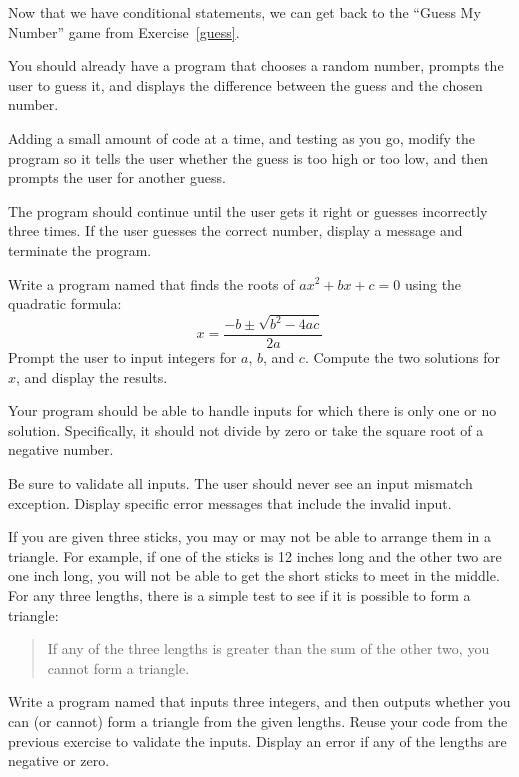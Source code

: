 \begin{exercise}  %

Now that we have conditional statements, we can get back to the ``Guess My Number'' game from Exercise~\ref{guess}.

You should already have a program that chooses a random number, prompts the user to guess it, and displays the difference between the guess and the chosen number.

Adding a small amount of code at a time, and testing as you go, modify the program so it tells the user whether the guess is too high or too low, and then prompts the user for another guess.

The program should continue until the user gets it right or guesses incorrectly three times.
If the user guesses the correct number, display a message and terminate the program.

\end{exercise}


\begin{exercise}  %

Write a program named  that finds the roots of $ax^2 + bx + c = 0$ using the quadratic formula:
$$ x = \frac{-b \pm \sqrt{b^2 - 4ac}}{2a} $$
Prompt the user to input integers for $a$, $b$, and $c$.
Compute the two solutions for $x$, and display the results.

Your program should be able to handle inputs for which there is only one or no solution.
Specifically, it should not divide by zero or take the square root of a negative number.

Be sure to validate all inputs.
The user should never see an input mismatch exception.
Display specific error messages that include the invalid input.

\end{exercise}


\begin{exercise}  %

If you are given three sticks, you may or may not be able to arrange them in a triangle.
For example, if one of the sticks is 12 inches long and the other two are one inch long, you will not be able to get the short sticks to meet in the middle.
For any three lengths, there is a simple test to see if it is possible to form a triangle:

\begin{quotation}
\noindent
If any of the three lengths is greater than the sum of the other two, you cannot form a triangle.
\end{quotation}

Write a program named  that inputs three integers, and then outputs whether you can (or cannot) form a triangle from the given lengths.
Reuse your code from the previous exercise to validate the inputs.
Display an error if any of the lengths are negative or zero.

\end{exercise}
